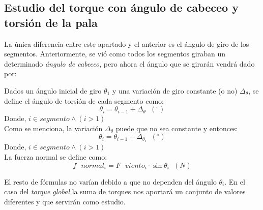  





 
 \subsection{Estudio del torque con ángulo de cabeceo y torsión de la pala}
\label{section:torque_giro_torsion}

La única diferencia entre este apartado y el anterior es el ángulo de giro de los segmentos. Anteriormente, se vió como todos los segmentos giraban un determinado \textit{ángulo de cabeceo}, pero ahora el ángulo que se girarán vendrá dado por:

Dados un ángulo inicial de giro $\theta_1 $ y una variación de giro constante (o no) $\Delta_\theta$, se define el ángulo de torsión de cada segmento como:
\begin{equation}
\theta_i = \theta_{i-1} + \Delta_\theta \hspace{7pt} (^{\circ})
\label{def:theta_cte}
\end{equation}
Donde, $i \in segmento \wedge (i > 1)$\\


Como se menciona, la variación $\Delta_\theta$ puede que no sea constante y entonces:
\begin{equation}
\theta_i = \theta_{i-1} + \Delta_{\theta_{i}}  \hspace{7pt} (^{\circ})
\label{def:theta_nocte}
\end{equation}
Donde, $i \in segmento \wedge (i > 1)$\\

La fuerza normal se define como:
\begin{equation}
   f \text{ } normal_i = F \text{ } viento_i \cdot \sin{\theta_i} \hspace{7pt} (N)
  \label{def:fuerza_normal_torsion}
 \end{equation}

El resto de fórmulas no varían debido a que no dependen del ángulo $\theta_i$. En el caso del \textit{torque global} la suma de torques nos aportará un conjunto de valores diferentes y que servirán como estudio.

